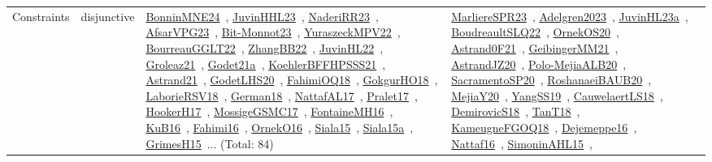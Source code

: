 {\begin{longtable}{lp{3cm}>{\raggedright\arraybackslash}p{6cm}>{\raggedright\arraybackslash}p{6cm}>{\raggedright\arraybackslash}p{8cm}}
Constraints & disjunctive & \href{../works/BonninMNE24.pdf}{BonninMNE24}~\cite{BonninMNE24}, \href{../works/JuvinHHL23.pdf}{JuvinHHL23}~\cite{JuvinHHL23}, \href{../works/NaderiRR23.pdf}{NaderiRR23}~\cite{NaderiRR23}, \href{../works/AfsarVPG23.pdf}{AfsarVPG23}~\cite{AfsarVPG23}, \href{../works/Bit-Monnot23.pdf}{Bit-Monnot23}~\cite{Bit-Monnot23}, \href{../works/YuraszeckMPV22.pdf}{YuraszeckMPV22}~\cite{YuraszeckMPV22}, \href{../works/BourreauGGLT22.pdf}{BourreauGGLT22}~\cite{BourreauGGLT22}, \href{../works/ZhangBB22.pdf}{ZhangBB22}~\cite{ZhangBB22}, \href{../works/JuvinHL22.pdf}{JuvinHL22}~\cite{JuvinHL22}, \href{../works/Groleaz21.pdf}{Groleaz21}~\cite{Groleaz21}, \href{../works/Godet21a.pdf}{Godet21a}~\cite{Godet21a}, \href{../works/KoehlerBFFHPSSS21.pdf}{KoehlerBFFHPSSS21}~\cite{KoehlerBFFHPSSS21}, \href{../works/Astrand21.pdf}{Astrand21}~\cite{Astrand21}, \href{../works/GodetLHS20.pdf}{GodetLHS20}~\cite{GodetLHS20}, \href{../works/FahimiOQ18.pdf}{FahimiOQ18}~\cite{FahimiOQ18}, \href{../works/GokgurHO18.pdf}{GokgurHO18}~\cite{GokgurHO18}, \href{../works/LaborieRSV18.pdf}{LaborieRSV18}~\cite{LaborieRSV18}, \href{../works/German18.pdf}{German18}~\cite{German18}, \href{../works/NattafAL17.pdf}{NattafAL17}~\cite{NattafAL17}, \href{../works/Pralet17.pdf}{Pralet17}~\cite{Pralet17}, \href{../works/HookerH17.pdf}{HookerH17}~\cite{HookerH17}, \href{../works/MossigeGSMC17.pdf}{MossigeGSMC17}~\cite{MossigeGSMC17}, \href{../works/FontaineMH16.pdf}{FontaineMH16}~\cite{FontaineMH16}, \href{../works/KuB16.pdf}{KuB16}~\cite{KuB16}, \href{../works/Fahimi16.pdf}{Fahimi16}~\cite{Fahimi16}, \href{../works/OrnekO16.pdf}{OrnekO16}~\cite{OrnekO16}, \href{../works/Siala15.pdf}{Siala15}~\cite{Siala15}, \href{../works/Siala15a.pdf}{Siala15a}~\cite{Siala15a}, \href{../works/GrimesH15.pdf}{GrimesH15}~\cite{GrimesH15}... (Total: 84) & \href{../works/MarliereSPR23.pdf}{MarliereSPR23}~\cite{MarliereSPR23}, \href{../works/Adelgren2023.pdf}{Adelgren2023}~\cite{Adelgren2023}, \href{../works/JuvinHL23a.pdf}{JuvinHL23a}~\cite{JuvinHL23a}, \href{../works/BoudreaultSLQ22.pdf}{BoudreaultSLQ22}~\cite{BoudreaultSLQ22}, \href{../works/OrnekOS20.pdf}{OrnekOS20}~\cite{OrnekOS20}, \href{../works/Astrand0F21.pdf}{Astrand0F21}~\cite{Astrand0F21}, \href{../works/GeibingerMM21.pdf}{GeibingerMM21}~\cite{GeibingerMM21}, \href{../works/AstrandJZ20.pdf}{AstrandJZ20}~\cite{AstrandJZ20}, \href{../works/Polo-MejiaALB20.pdf}{Polo-MejiaALB20}~\cite{Polo-MejiaALB20}, \href{../works/SacramentoSP20.pdf}{SacramentoSP20}~\cite{SacramentoSP20}, \href{../works/RoshanaeiBAUB20.pdf}{RoshanaeiBAUB20}~\cite{RoshanaeiBAUB20}, \href{../works/MejiaY20.pdf}{MejiaY20}~\cite{MejiaY20}, \href{../works/YangSS19.pdf}{YangSS19}~\cite{YangSS19}, \href{../works/CauwelaertLS18.pdf}{CauwelaertLS18}~\cite{CauwelaertLS18}, \href{../works/DemirovicS18.pdf}{DemirovicS18}~\cite{DemirovicS18}, \href{../works/TanT18.pdf}{TanT18}~\cite{TanT18}, \href{../works/KameugneFGOQ18.pdf}{KameugneFGOQ18}~\cite{KameugneFGOQ18}, \href{../works/Dejemeppe16.pdf}{Dejemeppe16}~\cite{Dejemeppe16}, \href{../works/Nattaf16.pdf}{Nattaf16}~\cite{Nattaf16}, \href{../works/SimoninAHL15.pdf}{SimoninAHL15}~\cite{SimoninAHL15}, 
\end{longtable}}
